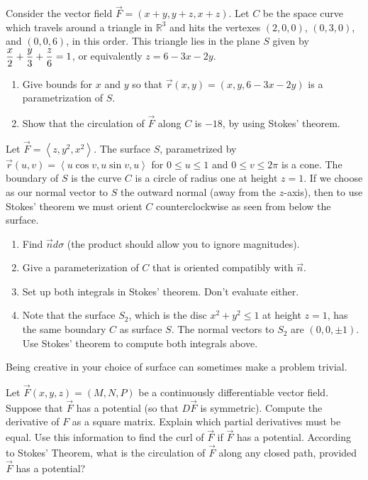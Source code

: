 \begin{problem}
Consider the vector field $\vec F = \left(x+y, y+z, x+z\right)$. 
Let $C$ be the space curve which travels around a triangle in $\mathbb{R}^3$ and hits the vertexes $(2,0,0)$, $(0,3,0)$, and $(0,0,6)$, in this order. 
This triangle lies in the plane $S$ given by $\displaystyle \frac x2+\frac y3 +\frac z6=1$, or equivalently $z=6-3x-2y$. 
\begin{enumerate}
 \item Give bounds for $x$ and $y$ so that $\vec r(x,y)=(x,y,6-3x-2y)$ is a parametrization of $S$.
 \item Show that the circulation of $\vec F$ along $C$ is $-18$, by using Stokes' theorem.
\end{enumerate}
\end{problem}


\begin{problem}
Let $\vec F = \left<z,y^2,x^2\right>$. The surface $S$, parametrized by $\vec r(u,v) = \left<u\cos v,u\sin v, u\right>$ for $0\leq u\leq 1$ and $0\leq v\leq 2\pi$ is a cone. The boundary of $S$ is the curve $C$ is a circle of radius one at height $z=1$. If we choose as our normal vector to $S$ the outward normal (away from the $z$-axis), then to use Stokes' theorem we must orient $C$ counterclockwise as seen from below the surface. 
\begin{enumerate}
 \item Find $\vec n d\sigma$ (the product should allow you to ignore magnitudes). 
 \item Give a parameterization of $C$ that is oriented compatibly with $\vec n$.
 \item Set up both integrals in Stokes' theorem. Don't evaluate either.
 \item Note that the surface $S_2$, which is the disc $x^2+y^2\leq 1$ at height $z=1$, has the same boundary $C$ as surface $S$. The normal vectors to $S_2$ are $(0,0,\pm 1)$. Use Stokes' theorem to compute both integrals above. 
\end{enumerate}
Being creative in your choice of surface can sometimes make a problem trivial.
\end{problem}

\begin{problem}
 Let $\vec F(x,y,z)=(M,N,P)$ be a continuously differentiable vector field. Suppose that $\vec F$ has a potential (so that $D\vec F$ is symmetric).  Compute the derivative of $F$ as a square matrix. Explain which partial derivatives must be equal. Use this information to find the curl of $\vec F$ if $\vec F$ has a potential. According to Stokes' Theorem, what is the circulation of $\vec F$ along any closed path, provided $\vec F$ has a potential?
\end{problem}


